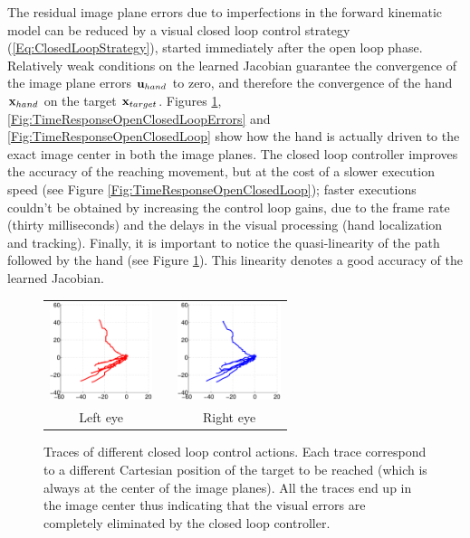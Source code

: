 The residual image plane errors 
due to imperfections in the forward kinematic model can be reduced by a visual closed loop
control strategy (\ref{Eq:ClosedLoopStrategy}), started immediately after the open loop phase. Relatively weak conditions on the learned 
Jacobian \cite{Samson91robot} guarantee the convergence of the image plane errors $\mathbf{u}_{hand}$ to zero, and therefore
the convergence of the hand $\mathbf{x}_{hand}$ on the target $\mathbf{x}_{target}$. Figures
\ref{Fig:ImagePlaneClosedLoopErrors}, %
\ref{Fig:TimeResponseOpenClosedLoopErrors} and \ref{Fig:TimeResponseOpenClosedLoop}  
show how the hand is actually driven to the 
exact image center in both the image planes. The closed loop controller 
improves the accuracy of the reaching movement, but at the cost of a slower 
execution speed (see Figure \ref{Fig:TimeResponseOpenClosedLoop}); faster
executions couldn't be obtained by increasing the control loop gains, due to
the frame rate (thirty milliseconds) and the delays in the visual processing (hand localization and tracking).
Finally, it is important to notice 
the quasi-linearity of the path followed by the hand 
(see Figure \ref{Fig:ImagePlaneClosedLoopErrors}). This linearity denotes 
a good accuracy of the learned Jacobian.

\begin{figure}[th!]
  \begin{center}
	\begin{tabular}{ccc}
	  \parbox{30mm}{\includegraphics[width=30mm]{Figure/LeftEyeClosedLoop.eps}}  & \hspace{.1cm} &
	  \parbox{30mm}{\includegraphics[width=30mm]{Figure/RightEyeClosedLoop.eps}}
	  \\
	  \parbox{30mm}{\centering Left eye } & \hspace{0.1cm} & \parbox{30mm}{\centering Right eye }
  \end{tabular}
\end{center}
\caption{Traces of different closed loop control actions. Each trace correspond to a different Cartesian position of the target to be reached (which 
is always at the center of the image planes). All the traces end up in the image center thus indicating that the visual errors are completely eliminated by the closed loop controller.}\label{Fig:ImagePlaneClosedLoopErrors}
  \end{figure}

